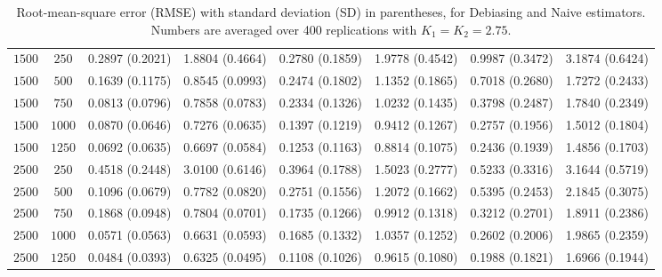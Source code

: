 \begin{table}[H]
{\begin{tabular}{cccccccc}
$1500$& \multicolumn{1}{c|}{$250$}   & 0.2897 (0.2021) & 1.8804 (0.4664) & 0.2780 (0.1859) & 1.9778 (0.4542) & 0.9987 (0.3472) & 3.1874 (0.6424) \\
$1500$& \multicolumn{1}{c|}{$500$}   & 0.1639 (0.1175) & 0.8545 (0.0993) & 0.2474 (0.1802) & 1.1352 (0.1865) & 0.7018 (0.2680) & 1.7272 (0.2433) \\
$1500$& \multicolumn{1}{c|}{$750$}   & 0.0813 (0.0796) & 0.7858 (0.0783) & 0.2334 (0.1326) & 1.0232 (0.1435) & 0.3798 (0.2487) & 1.7840 (0.2349) \\
$1500$& \multicolumn{1}{c|}{$1000$}  & 0.0870 (0.0646) & 0.7276 (0.0635) & 0.1397 (0.1219) & 0.9412 (0.1267) & 0.2757 (0.1956) & 1.5012 (0.1804) \\
$1500$& \multicolumn{1}{c|}{$1250$}  & 0.0692 (0.0635) & 0.6697 (0.0584) & 0.1253 (0.1163) & 0.8814 (0.1075) & 0.2436 (0.1939) & 1.4856 (0.1703) \\ \hline
$2500$& \multicolumn{1}{c|}{$250$}   & 0.4518 (0.2448) & 3.0100 (0.6146) & 0.3964 (0.1788) & 1.5023 (0.2777) & 0.5233 (0.3316) & 3.1644 (0.5719) \\
$2500$& \multicolumn{1}{c|}{$500$}   & 0.1096 (0.0679) & 0.7782 (0.0820) & 0.2751 (0.1556) & 1.2072 (0.1662) & 0.5395 (0.2453) & 2.1845 (0.3075) \\
$2500$& \multicolumn{1}{c|}{$750$}   & 0.1868 (0.0948) & 0.7804 (0.0701) & 0.1735 (0.1266) & 0.9912 (0.1318) & 0.3212 (0.2701) & 1.8911 (0.2386) \\
$2500$& \multicolumn{1}{c|}{$1000$}  & 0.0571 (0.0563) & 0.6631 (0.0593) & 0.1685 (0.1332) & 1.0357 (0.1252) & 0.2602 (0.2006) & 1.9865 (0.2359) \\
$2500$& \multicolumn{1}{c|}{$1250$}  & 0.0484 (0.0393) & 0.6325 (0.0495) & 0.1108 (0.1026) & 0.9615 (0.1080) & 0.1988 (0.1821) & 1.6966 (0.1944) \\ \hline
\end{tabular}%
}
\caption{Root-mean-square error (RMSE) with standard deviation (SD) in parentheses, for Debiasing and Naive estimators. Numbers are averaged over 400 replications with $K_1 = K_2 = 2.75$.}
\label{tab:simu_combined}
\end{table}

